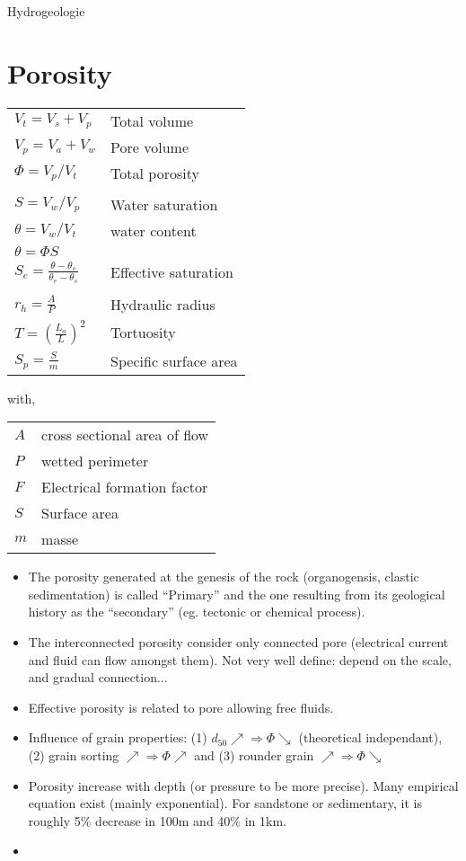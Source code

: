 \documentclass[twocolumn]{article}
\begin{document}
\begin{center}
     \Large{Hydrogeologie} \\
\end{center}

\section{Porosity}
\begin{tabular}{@{}ll@{}}
$ V_t=V_s+V_p$ & Total volume\\
$ V_p=V_a+V_w$ & Pore volume\\
$ \Phi={V_p}/{V_t}$   & Total porosity \\
\\
$ S={V_w}/{V_p}$ & Water saturation\\
$ \theta ={V_w}/{V_t}$ & water content\\
$\theta=\Phi S$ &\\
$ S_e = \frac{\theta -\theta_s}{\theta_r-\theta_s}$ & Effective saturation\\
\\
$ r_h=\frac{A}{P} $  & Hydraulic radius \\
$ T= \left(\frac{L_a}{L}\right)^2 $ & Tortuosity \\
$ S_p= \frac{S}{m}$ & Specific surface area\\
\end{tabular}
with,
\begin{tabular}{@{}ll@{}}
$A$    & cross sectional area of flow  \\
$P$    & wetted perimeter \\
$F$ 	& Electrical formation factor\\
$S$ & Surface area\\
$m$ & masse\\
\end{tabular}

\begin{itemize}
	\item The porosity generated at the genesis of the rock (organogensis, clastic sedimentation) is called ``Primary'' and the one resulting from its geological history as the ``secondary'' (eg. tectonic or chemical process).
	\item The interconnected porosity consider only connected pore (electrical current and fluid can flow amongst them). Not very well define: depend on the scale, and gradual connection...
	\item Effective porosity is related to pore allowing free fluids. 
	\item Influence of grain properties: (1) $d_{50} \nearrow \Rightarrow\Phi \searrow$ (theoretical independant), (2) grain sorting $\nearrow \Rightarrow\Phi \nearrow$ and (3) rounder grain $\nearrow \Rightarrow \Phi \searrow$
	\item Porosity increase with depth (or pressure to be more precise). Many empirical equation exist (mainly exponential). For sandstone or sedimentary, it is roughly 5\% decrease in 100m and 40\% in 1km. 
	\item 
\end{itemize}
\end{document}
